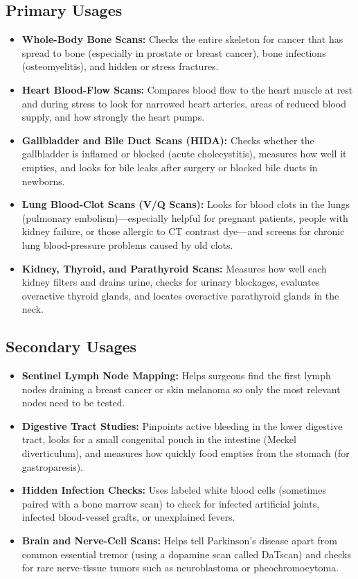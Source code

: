 \subsection{Primary Usages}
\begin{itemize}
\item \textbf{Whole-Body Bone Scans:} Checks the entire skeleton for cancer that has spread to bone (especially in prostate or breast cancer), bone infections (osteomyelitis), and hidden or stress fractures.
\item \textbf{Heart Blood-Flow Scans:} Compares blood flow to the heart muscle at rest and during stress to look for narrowed heart arteries, areas of reduced blood supply, and how strongly the heart pumps.
\item \textbf{Gallbladder and Bile Duct Scans (HIDA):} Checks whether the gallbladder is inflamed or blocked (acute cholecystitis), measures how well it empties, and looks for bile leaks after surgery or blocked bile ducts in newborns.
\item \textbf{Lung Blood-Clot Scans (V/Q Scans):} Looks for blood clots in the lungs (pulmonary embolism)---especially helpful for pregnant patients, people with kidney failure, or those allergic to CT contrast dye---and screens for chronic lung blood-pressure problems caused by old clots.
\item \textbf{Kidney, Thyroid, and Parathyroid Scans:} Measures how well each kidney filters and drains urine, checks for urinary blockages, evaluates overactive thyroid glands, and locates overactive parathyroid glands in the neck.
\end{itemize}

\subsection{Secondary Usages}
\begin{itemize}
\item \textbf{Sentinel Lymph Node Mapping:} Helps surgeons find the first lymph nodes draining a breast cancer or skin melanoma so only the most relevant nodes need to be tested.
\item \textbf{Digestive Tract Studies:} Pinpoints active bleeding in the lower digestive tract, looks for a small congenital pouch in the intestine (Meckel diverticulum), and measures how quickly food empties from the stomach (for gastroparesis).
\item \textbf{Hidden Infection Checks:} Uses labeled white blood cells (sometimes paired with a bone marrow scan) to check for infected artificial joints, infected blood-vessel grafts, or unexplained fevers.
\item \textbf{Brain and Nerve-Cell Scans:} Helps tell Parkinson's disease apart from common essential tremor (using a dopamine scan called DaTscan) and checks for rare nerve-tissue tumors such as neuroblastoma or pheochromocytoma.
\end{itemize}


